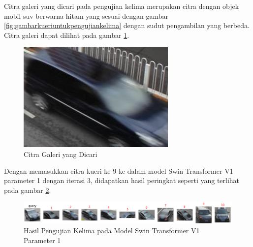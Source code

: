 Citra galeri yang dicari pada pengujian kelima merupakan citra dengan objek \linebreak mobil suv berwarna hitam 
yang sesuai dengan gambar \ref{fig:gambarkueriuntukpengujiankelima} dengan sudut pengambilan yang berbeda. 
Citra galeri dapat dilihat pada gambar \ref{fig:gambargaleriuntukpengujiankelima}.

\begin{figure}[h!]
  \centering
  \includegraphics[scale=0.6]{gambar/Gal9_1019.jpg}
  \caption{Citra Galeri yang Dicari}
  \label{fig:gambargaleriuntukpengujiankelima}
\end{figure}


Dengan memasukkan citra kueri ke-9 ke dalam model Swin Transformer V1 parameter 1 dengan iterasi 3, didapatkan hasil 
peringkat seperti yang terlihat pada gambar \ref{fig:hasilpengujiankelimapadamodelswintransformerv1param1}.

\begin{figure}[h!]
  \centering
  \includegraphics[scale=0.6]{gambar/Que9V1P1IT3.png}
  \caption{Hasil Pengujian Kelima pada Model Swin Transformer V1 Parameter 1}
  \label{fig:hasilpengujiankelimapadamodelswintransformerv1param1}
\end{figure}

